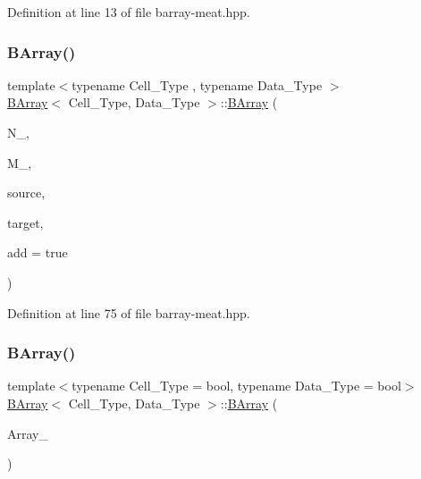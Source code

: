 Definition at line 13 of file barray-\/meat.\+hpp.

\mbox{\label{class_b_array_aa5f13f86c045a1f9c39b9a7df4126c78}} 
\subsubsection{\texorpdfstring{B\+Array()}{BArray()}\hspace{0.1cm}{\footnotesize\ttfamily [4/5]}}
{\footnotesize\ttfamily template$<$typename Cell\+\_\+\+Type , typename Data\+\_\+\+Type $>$ \\
\hyperlink{class_b_array}{B\+Array}$<$ Cell\+\_\+\+Type, Data\+\_\+\+Type $>$\+::\hyperlink{class_b_array}{B\+Array} (\begin{DoxyParamCaption}\item[{\hyperlink{typedefs_8hpp_a91ad9478d81a7aaf2593e8d9c3d06a14}{uint}}]{N\+\_\+,  }\item[{\hyperlink{typedefs_8hpp_a91ad9478d81a7aaf2593e8d9c3d06a14}{uint}}]{M\+\_\+,  }\item[{const std\+::vector$<$ \hyperlink{typedefs_8hpp_a91ad9478d81a7aaf2593e8d9c3d06a14}{uint} $>$ \&}]{source,  }\item[{const std\+::vector$<$ \hyperlink{typedefs_8hpp_a91ad9478d81a7aaf2593e8d9c3d06a14}{uint} $>$ \&}]{target,  }\item[{bool}]{add = {\ttfamily true} }\end{DoxyParamCaption})\hspace{0.3cm}{\ttfamily [inline]}}



Definition at line 75 of file barray-\/meat.\+hpp.

\mbox{\label{class_b_array_ac003699092c4f91c5b292320ca769f85}} 
\subsubsection{\texorpdfstring{B\+Array()}{BArray()}\hspace{0.1cm}{\footnotesize\ttfamily [5/5]}}
{\footnotesize\ttfamily template$<$typename Cell\+\_\+\+Type = bool, typename Data\+\_\+\+Type = bool$>$ \\
\hyperlink{class_b_array}{B\+Array}$<$ Cell\+\_\+\+Type, Data\+\_\+\+Type $>$\+::\hyperlink{class_b_array}{B\+Array} (\begin{DoxyParamCaption}\item[{const \hyperlink{class_b_array}{B\+Array}$<$ Cell\+\_\+\+Type, Data\+\_\+\+Type $>$ \&}]{Array\+\_\+ }\end{DoxyParamCaption})\hspace{0.3cm}{\ttfamily [inline]}}




